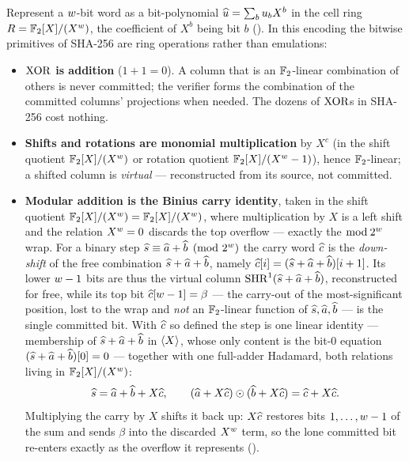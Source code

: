 Represent a $w$-bit word as a bit-polynomial $\widehat{u}=\sum_b u_b X^b$ in
the cell ring $R=\mathbb{F}_2[X]/(X^{w})$, the coefficient of $X^b$
being bit $b$ (). In this encoding the bitwise primitives
of SHA-256 are ring operations rather than emulations:
\begin{itemize}[leftmargin=2em]
  \item \textbf{$\operatorname{XOR}$ is addition} ($1+1=0$). A column that is an
    $\mathbb{F}_2$-linear combination of others is never committed; the verifier
    forms the combination of the committed columns' projections when needed.
    The dozens of $\operatorname{XOR}$s in SHA-256 cost nothing.
  \item \textbf{Shifts and rotations are monomial multiplication} by $X^c$
    (in the shift quotient $\mathbb{F}_2[X]/(X^{w})$ or rotation quotient $\mathbb{F}_2[X]/(X^{w}-1)$), hence
    $\mathbb{F}_2$-linear; a shifted column is \emph{virtual} --- reconstructed
    from its source, not committed.
  \item \textbf{Modular addition is the Binius carry identity}, taken in the
    shift quotient $\mathbb{F}_2[X]/(X^{w})=\mathbb{F}_2[X]/(X^{w})$, where multiplication by $X$
    is a left shift and the relation $X^{w}=0$ discards the top overflow ---
    exactly the $\bmod\,2^{w}$ wrap. For a binary step
    $\widehat{s}\equiv\widehat{a}+\widehat{b}\pmod{2^{w}}$ the carry word $\widehat{c}$ is the
    \emph{down-shift} of the free combination $\widehat{s}+\widehat{a}+\widehat{b}$, namely
    $\widehat{c}[i]=(\widehat{s}+\widehat{a}+\widehat{b})[i+1]$. Its lower $w-1$ bits are thus
    the virtual column $\operatorname{SHR}^{1}(\widehat{s}+\widehat{a}+\widehat{b})$, reconstructed for free,
    while its top bit $\widehat{c}[w-1]=\beta$ --- the carry-out of the
    most-significant position, lost to the wrap and \emph{not} an
    $\mathbb{F}_2$-linear function of $\widehat{s},\widehat{a},\widehat{b}$ --- is the single
    committed bit. With $\widehat{c}$ so defined the step is one linear identity ---
    membership of $\widehat{s}+\widehat{a}+\widehat{b}$ in $\langle X \rangle$, whose only content is
    the bit-$0$ equation $(\widehat{s}+\widehat{a}+\widehat{b})[0]=0$ --- together with one
    full-adder Hadamard, both relations living in $\mathbb{F}_2[X]/(X^{w})$:
    \[
      \widehat{s}=\widehat{a}+\widehat{b}+X\widehat{c},
      \qquad
      (\widehat{a}+X\widehat{c})\odot(\widehat{b}+X\widehat{c}) = \widehat{c}+X\widehat{c}.
    \]
    Multiplying the carry by $X$ shifts it back up: $X\widehat{c}$ restores bits
    $1,\dots,w-1$ of the sum and sends $\beta$ into the discarded
    $X^{w}$ term, so the lone committed bit re-enters exactly as the
    overflow it represents ().
\end{itemize}

